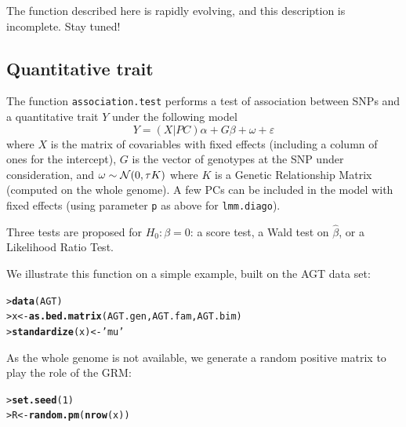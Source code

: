 \documentclass{article}\usepackage[]{graphicx}\usepackage[]{color}
\makeatletter
\newcommand{\hlnum}[1]{\textcolor[rgb]{0.686,0.059,0.569}{#1}}%
\newcommand{\hlstr}[1]{\textcolor[rgb]{0.192,0.494,0.8}{#1}}%
\newcommand{\hlstd}[1]{\textcolor[rgb]{0.345,0.345,0.345}{#1}}%
\newcommand{\hlkwb}[1]{\textcolor[rgb]{0.69,0.353,0.396}{#1}}%
\newcommand{\hlkwd}[1]{\textcolor[rgb]{0.737,0.353,0.396}{\textbf{#1}}}%
\newenvironment{kframe}{%
 \def\at@end@of@kframe{}%
 \ifinner\ifhmode%
  \def\at@end@of@kframe{\end{minipage}}%
  \begin{minipage}{\columnwidth}%
 \fi\fi%
 \def\FrameCommand##1{\hskip\@totalleftmargin \hskip-\fboxsep
 \colorbox{shadecolor}{##1}\hskip-\fboxsep
     \hskip-\linewidth \hskip-\@totalleftmargin \hskip\columnwidth}%
 \MakeFramed {\advance\hsize-\width
   \@totalleftmargin\z@ \linewidth\hsize
   \@setminipage}}%
 {\par\unskip\endMakeFramed%
 \at@end@of@kframe}
\newenvironment{knitrout}{}{} %
\makeatother
\begin{document}
The function described here is rapidly evolving, and this description is incomplete. 
Stay tuned!

\subsection{Quantitative trait}

  The function \verb!association.test! performs a test of association between SNPs 
  and a quantitative trait $Y$ under the following model
\begin{equation*}
  Y = (X|PC)\alpha + G\beta + \omega + \varepsilon 
\end{equation*}
  where $X$ is the matrix of covariables with fixed effects (including a column 
  of ones for the intercept), $G$ is the vector of genotypes at the SNP under
  consideration, and $\omega\sim\mathcal{N}(0,\tau K)$ where $K$ is a Genetic Relationship
  Matrix (computed on the whole genome). A few PCs can be included in the model
  with fixed effects (using parameter \verb!p! as above for \verb!lmm.diago!).

  Three tests are proposed for $H_0: \beta = 0$: a score test, a Wald test on $\widehat\beta$,
  or a Likelihood Ratio Test.

  We illustrate this function on a simple example, built on the AGT data set:
\begin{knitrout}
\color{fgcolor}\begin{kframe}
\begin{alltt}
\hlstd{> }\hlkwd{data}\hlstd{(AGT)}
\hlstd{> }\hlstd{x} \hlkwb{<-} \hlkwd{as.bed.matrix}\hlstd{(AGT.gen, AGT.fam, AGT.bim)}
\hlstd{> }\hlkwd{standardize}\hlstd{(x)} \hlkwb{<-} \hlstr{'mu'}
\end{alltt}
\end{kframe}
\end{knitrout}

  As the whole genome is not available, we generate a random positive matrix to play the role of the GRM:
\begin{knitrout}
\color{fgcolor}\begin{kframe}
\begin{alltt}
\hlstd{> }\hlkwd{set.seed}\hlstd{(}\hlnum{1}\hlstd{)}
\hlstd{> }\hlstd{R} \hlkwb{<-} \hlkwd{random.pm}\hlstd{(}\hlkwd{nrow}\hlstd{(x))}
\end{alltt}
\end{kframe}
\end{knitrout}
\end{document}
